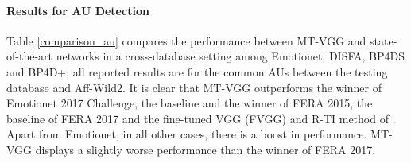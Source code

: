 \documentclass{bmvc2k}
\begin{document}
\paragraph{Results for AU Detection} 
 \vskip-0.35cm
Table \ref{comparison_au} compares the performance between MT-VGG and state-of-the-art networks in a cross-database setting among Emotionet, DISFA, BP4DS  and BP4D+; all reported results are for the common AUs between the testing database and Aff-Wild2. It is clear that MT-VGG outperforms the winner \cite{ding2017facial} of Emotionet 2017 Challenge, the baseline \cite{valstar2015fera} and the winner \cite{yuce2015discriminant} of FERA 2015, the baseline \cite{valstar2017fera} of FERA 2017 and the fine-tuned VGG (FVGG) and R-TI method of \cite{li2017action}. Apart from Emotionet, in all other cases, there is a boost in performance. MT-VGG displays a slightly worse performance than the winner \cite{tang2017view} of FERA 2017.













\begin{table}[ht]
\caption{Cross-database evaluation for AU Detection: evaluation metric is  F1 score}
\label{comparison_au}
\centering
{}
\end{table}
\end{document}
